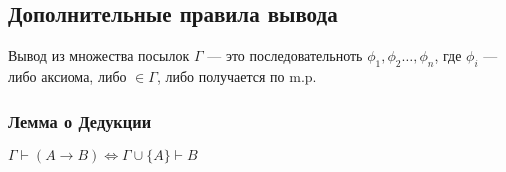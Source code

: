 

\subsection{Дополнительные правила вывода}
\begin{definition}
    Вывод из множества посылок $\Gamma$ --- это последовательноть $\phi_1, \phi_2 \dots, \phi_n$, где $\phi_i$ --- либо аксиома, либо $\in \Gamma$, либо получается по m.p.
\end{definition}


\subsubsection{Лемма о Дедукции}
\begin{lemma}[О дедукции]
    $\Gamma \vdash (A \rightarrow B) \Leftrightarrow \Gamma \cup \{A\} \vdash B$
\end{lemma}
